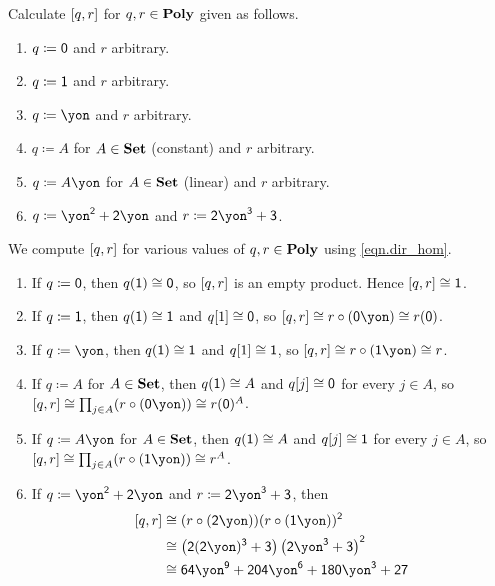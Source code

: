 \documentclass[Book-Poly]{subfiles}
\begin{document}
\begin{exercise}
Calculate $[q,r]$ for $q,r\in\mathbf{Poly}$ given as follows.
\begin{enumerate}
	\item $q\coloneqq \textsf{0}$ and $r$ arbitrary.
	\item $q\coloneqq \textsf{1}$ and $r$ arbitrary.
	\item $q\coloneqq\yon$ and $r$ arbitrary.
	\item $q\coloneqq A$ for $A\in\mathbf{Set}$ (constant) and $r$ arbitrary.
	\item $q\coloneqq A\yon$ for $A\in\mathbf{Set}$ (linear) and $r$ arbitrary.
	\item $q\coloneqq\yon^\2+\2\yon$ and $r\coloneqq\2\yon^\3+\3$.
\qedhere
\end{enumerate}
\begin{solution}
We compute $[q,r]$ for various values of $q, r \in \mathbf{Poly}$ using \eqref{eqn.dir_hom}.
\begin{enumerate}
    \item If $q \coloneqq \textsf{0}$, then $q(\textsf{1}) \cong \textsf{0}$, so $[q,r]$ is an empty product.
    Hence $[q,r] \cong \textsf{1}$.
    \item If $q \coloneqq \textsf{1}$, then $q(\textsf{1}) \cong \textsf{1}$ and $q[1] \cong \textsf{0}$, so $\ihom{q,r} \iso r \circ (\0\yon) \iso r(\0)$.
    \item If $q \coloneqq \yon$, then $q(\textsf{1}) \cong \textsf{1}$ and $q[1] \cong \textsf{1}$, so $\ihom{q,r} \iso r \circ (\1\yon) \iso r$.
	\item If $q \coloneqq A$ for $A \in \mathbf{Set}$, then $q(\textsf{1}) \cong A$ and $q[j] \cong \textsf{0}$ for every $j \in A$, so $\ihom{q,r} \iso \prod_{j \in A} (r \circ (\0\yon)) \iso r(\0)^A$.
	\item If $q \coloneqq A\yon$ for $A\in\mathbf{Set}$, then $q(\textsf{1}) \cong A$ and $q[j] \cong \textsf{1}$ for every $j \in A$, so $\ihom{q,r} \iso \prod_{j \in A} (r \circ (\1\yon)) \iso r^A$.
	\item If $q\coloneqq\yon^\2+\2\yon$ and $r\coloneqq\2\yon^\3+\3$, then
	\begin{align*}
	    \ihom{q,r} &\iso (r \circ (\2\yon))(r \circ (\1\yon))^\2 \\
	    &\iso \left(\2(\2\yon)^\3 + \3\right)\left(\2\yon^\3 + \3\right)^\2 \\
	    &\iso \6\4\yon^\9 + \2\0\4\yon^\6 + \1\8\0\yon^\3 + \2\7 \\
	\end{align*}
\end{enumerate}
\end{solution}
\end{exercise}
\end{document}

